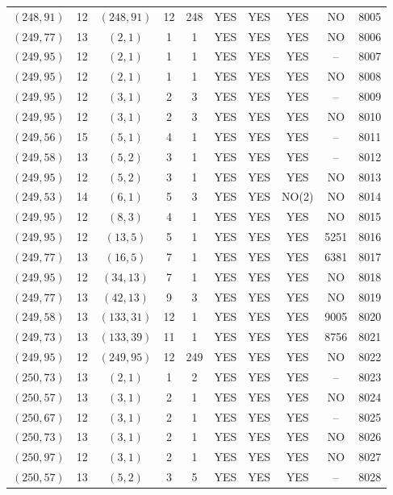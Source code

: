\begin{longtable}{|c|c|c|c|c|c|c|c|c|c|}
$(248, 91)$ & 12 & $(248, 91)$ & 12 & 248 & YES & YES & YES & NO & 8005\\
$(249, 77)$ & 13 & $(2, 1)$ & 1 & 1 & YES & YES & YES & NO & 8006\\
$(249, 95)$ & 12 & $(2, 1)$ & 1 & 1 & YES & YES & YES & -- & 8007\\
$(249, 95)$ & 12 & $(2, 1)$ & 1 & 1 & YES & YES & YES & NO & 8008\\
$(249, 95)$ & 12 & $(3, 1)$ & 2 & 3 & YES & YES & YES & -- & 8009\\
$(249, 95)$ & 12 & $(3, 1)$ & 2 & 3 & YES & YES & YES & NO & 8010\\
$(249, 56)$ & 15 & $(5, 1)$ & 4 & 1 & YES & YES & YES & -- & 8011\\
$(249, 58)$ & 13 & $(5, 2)$ & 3 & 1 & YES & YES & YES & -- & 8012\\
$(249, 95)$ & 12 & $(5, 2)$ & 3 & 1 & YES & YES & YES & NO & 8013\\
$(249, 53)$ & 14 & $(6, 1)$ & 5 & 3 & YES & YES & NO(2) & NO & 8014\\
$(249, 95)$ & 12 & $(8, 3)$ & 4 & 1 & YES & YES & YES & NO & 8015\\
$(249, 95)$ & 12 & $(13, 5)$ & 5 & 1 & YES & YES & YES & 5251 & 8016\\
$(249, 77)$ & 13 & $(16, 5)$ & 7 & 1 & YES & YES & YES & 6381 & 8017\\
$(249, 95)$ & 12 & $(34, 13)$ & 7 & 1 & YES & YES & YES & NO & 8018\\
$(249, 77)$ & 13 & $(42, 13)$ & 9 & 3 & YES & YES & YES & NO & 8019\\
$(249, 58)$ & 13 & $(133, 31)$ & 12 & 1 & YES & YES & YES & 9005 & 8020\\
$(249, 73)$ & 13 & $(133, 39)$ & 11 & 1 & YES & YES & YES & 8756 & 8021\\
$(249, 95)$ & 12 & $(249, 95)$ & 12 & 249 & YES & YES & YES & NO & 8022\\
$(250, 73)$ & 13 & $(2, 1)$ & 1 & 2 & YES & YES & YES & -- & 8023\\
$(250, 57)$ & 13 & $(3, 1)$ & 2 & 1 & YES & YES & YES & NO & 8024\\
$(250, 67)$ & 12 & $(3, 1)$ & 2 & 1 & YES & YES & YES & -- & 8025\\
$(250, 73)$ & 13 & $(3, 1)$ & 2 & 1 & YES & YES & YES & NO & 8026\\
$(250, 97)$ & 12 & $(3, 1)$ & 2 & 1 & YES & YES & YES & NO & 8027\\
$(250, 57)$ & 13 & $(5, 2)$ & 3 & 5 & YES & YES & YES & -- & 8028\\

\end{longtable}
